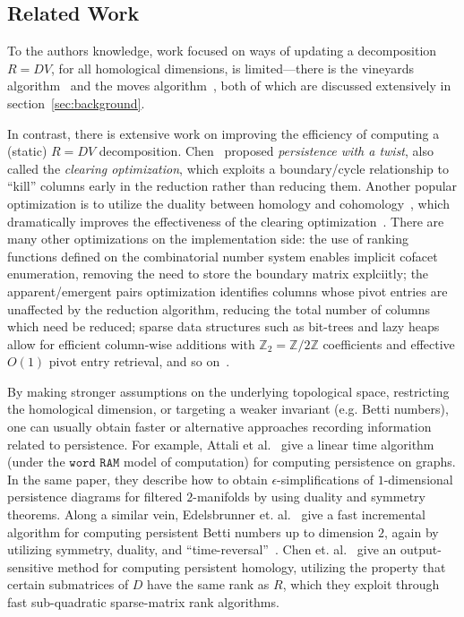 \documentclass{siamart190516}
\begin{document}
\subsection{Related Work}\label{sec:related_work} 
To the authors knowledge, work focused on ways of updating a  decomposition $R = DV$, for all homological dimensions, is limited---there is the vineyards algorithm~\cite{cohen2006vines} and the moves algorithm~\cite{busaryev2010tracking}, both of which are discussed extensively in section~\ref{sec:background}. 

In contrast, there is extensive work  on improving the efficiency of computing a (static) $R = DV$ decomposition. Chen~\cite{chen2011persistent} proposed \emph{persistence with a twist}, also called the \emph{clearing optimization}, which exploits a boundary/cycle relationship to ``kill'' columns early in the reduction rather than reducing them. 
Another popular optimization is to utilize the duality between   homology and cohomology~\cite{de2011dualities}, which dramatically improves the effectiveness of the clearing optimization~\cite{bauer2021ripser}. 
There are many other optimizations on the implementation side: the use of ranking functions defined on the combinatorial number system enables implicit cofacet enumeration, removing the need to store the boundary matrix explciitly; the apparent/emergent pairs optimization identifies columns whose pivot entries are unaffected by the reduction algorithm, reducing the total number of columns which need be reduced; sparse data structures such as bit-trees and lazy heaps allow for efficient column-wise additions with $\mathbb{Z}_2 = \mathbb{Z}/2\mathbb{Z}$ coefficients and effective $O(1)$ pivot entry retrieval, and so on~\cite{bauer2021ripser, bauer2017phat}. 

By making stronger assumptions on the underlying topological space, restricting the homological dimension, or targeting  a weaker invariant (e.g. Betti numbers), one can usually obtain  faster or alternative approaches  recording information related to persistence.
For example, Attali et al.~\cite{attali2009persistence} give a linear time algorithm (under the $\texttt{word RAM}$ model of computation) for computing persistence on graphs.
In the same paper, they describe how to obtain $\epsilon$-simplifications of $1$-dimensional persistence diagrams for filtered $2$-manifolds by using duality and symmetry theorems. 
Along a similar vein, Edelsbrunner et. al.~\cite{edelsbrunner2000topological} give a fast incremental algorithm for computing persistent Betti numbers up to dimension $2$, again by utilizing symmetry, duality, and ``time-reversal''~\cite{delfinado1995incremental}. Chen et. al.~\cite{chen2013output} give an output-sensitive method for computing persistent homology,  utilizing the property that certain submatrices of  $D$ have the same rank as  $R$, which they exploit through fast sub-quadratic sparse-matrix rank algorithms.  
\end{document}
